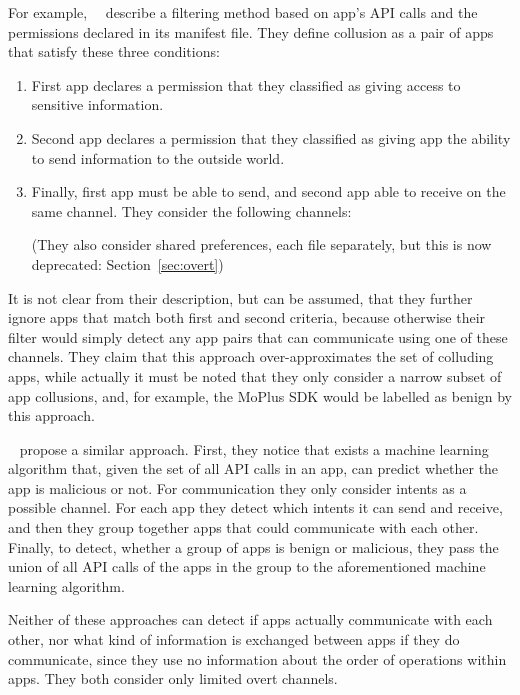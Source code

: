 \documentclass[article, oneside]{aaltoseries}
\newcommand{\Sref}[1]{Section~\ref{#1}}
\begin{document}
For example,~\citeauthor{Asavoae2016}~\cite{Asavoae2016} describe a filtering method based on app's API calls and the permissions declared in its manifest file. They define collusion as a pair of apps that satisfy these three conditions:
\begin{enumerate}
	\item First app declares a permission that they classified as giving access to sensitive information.
	\item Second app declares a permission that they classified as giving app the ability to send information to the outside world.
	\item Finally, first app must be able to send, and second app able to receive on the same channel. They consider the following channels:
	(They also consider shared preferences, each file separately, but this is now deprecated: \Sref{sec:overt})
\end{enumerate}
It is not clear from their description, but can be assumed, that they further ignore apps that match both first and second criteria, because otherwise their filter would simply detect any app pairs that can communicate using one of these channels. They claim that this approach over-approximates the set of colluding apps, while actually it must be noted that they only consider a narrow subset of app collusions, and, for example, the MoPlus SDK would be labelled as benign by this approach.

\citeauthor{Chen2018}~\cite{Chen2018} propose a similar approach. First, they notice that exists a machine learning algorithm that, given the set of all API calls in an app, can predict whether the app is malicious or not. For communication they only consider intents as a possible channel. For each app they detect which intents it can send and receive, and then they group together apps that could communicate with each other. Finally, to detect, whether a group of apps is benign or malicious, they pass the union of all API calls of the apps in the group to the aforementioned machine learning algorithm.

Neither of these approaches can detect if apps actually communicate with each other, nor what kind of information is exchanged between apps if they do communicate, since they use no information about the order of operations within apps. They both consider only limited overt channels.
\end{document}
